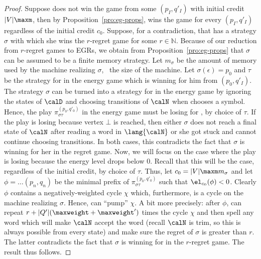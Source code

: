 \documentclass[a4paper]{article}
\begin{document}
\begin{proof}
	Suppose \eve does not win the game from some $(p_I,q'_I)$ with initial
	credit $|V|\maxm$, then by
	Proposition~\ref{pro:eg-props}, \adam wins the game for every
	$(p_I,q'_I)$ regardless of the initial credit $c_0$.  Suppose, for a
	contradiction, that \eve has a strategy $\sigma$ with which she wins the
	$r$-regret game for some $r \in \mathbb{N}$. Because of our reduction
	from $r$-regret games to EGRs, we obtain from
	Proposition~\ref{pro:eg-props} that $\sigma$ can be assumed to be a
	finite memory strategy. Let $m_\sigma$ be the amount of memory used by
	the machine realizing $\sigma$, \ie~the size of the machine.
	Let $\sigma(\epsilon) =
	p_0$ and $\tau$ be the strategy for \adam in the energy game which is
	winning for him from $(p_0,q'_I)$. The strategy $\sigma$ can be turned
	into a strategy for \eve in the energy game by ignoring the states of
	$\calD$ and choosing transitions of $\calN$ when \adam chooses a symbol.
	Hence, the play $\pi^{(p_0,q'_0)}_{\sigma \tau}$ in the energy game must
	be losing for \eve, by choice of $\tau$. If the play is losing because
	vertex $\bot$ is reached, then either $\sigma$ does not reach a final
	state of $\calN$ after reading a word in $\lang{\calN}$ or she got stuck
	and cannot continue choosing transitions. In both cases, this
	contradicts the fact that $\sigma$ is winning for her in the regret
	game. Now, we will focus on the case where 
	the play is losing because the energy level drops
	below $0$. Recall that this will be the case, regardless of the initial
	credit, by choice of $\tau$. Thus, let $c_0 = |V|\maxm m_\sigma$ and
	let $\phi = \dots (p_n,q_n)$ be the minimal prefix of $\pi^{(p_0,q'_0)}_{\sigma
	\tau}$ such that $\el_{c_0}(\phi) < 0$. Clearly $\phi$ contains a
	negatively-weighted cycle $\chi$ which, furthermore, is a cycle on the
	machine realizing $\sigma$. Hence, \adam can ``pump'' $\chi$. A bit more
	precisely: after $\phi$, \adam can repeat $r + |Q'|(\maxweight +
	\maxweight')$ times the cycle $\chi$ and then spell any word which will
	make $\calN$ accept the word (recall $\calN$ is trim, so this is always
	possible from every state) and make sure the regret of $\sigma$ is
	greater than $r$. The latter contradicts the fact that $\sigma$ is
	winning for \eve in the $r$-regret game. The result thus follows.
\end{proof}
\end{document}
